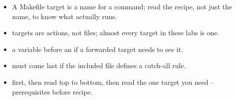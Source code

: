 \begin{itemize}
  \item A Makefile target is a name for a command; read the recipe, not
        just the name, to know what actually runs.
  \item {} targets are actions, not files; almost every target
        in these labs is one.
  \item {} a variable before an  if a forwarded
        target needs to see it.
  \item {} must come last if the included file defines a
        catch-all rule.
  \item {} first, then read top to bottom, then read the one
        target you need -- prerequisites before recipe.
\end{itemize}
